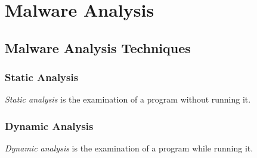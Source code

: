 \chapter{Malware Analysis} \label{chap:analysis}

\section{Malware Analysis Techniques}

\subsection*{Static Analysis}

\begin{definition}
\emph{Static analysis} is the examination of a program without running it. \cite{sikorski12}
\end{definition} 

\subsection*{Dynamic Analysis}

\begin{definition}
\emph{Dynamic analysis} is the examination of a program while running it.
\end{definition} 
